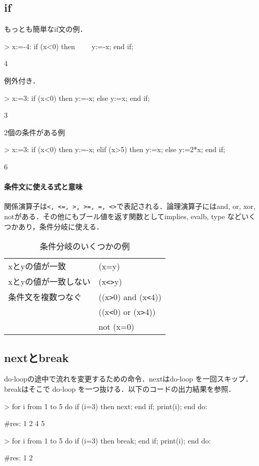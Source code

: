 \subsection{if}
もっとも簡単なif文の例．
\begin{MapleInput}
> x:=-4:
  if (x<0) then
 　　y:=-x; 
  end if;
\end{MapleInput}
\begin{MapleOutput}
 4
\end{MapleOutput}

例外付き．
\begin{MapleInput}
> x:=3:
  if (x<0) then 
    y:=-x; 
  else 
    y:=x; 
  end if;
\end{MapleInput}
\begin{MapleOutput}
3
\end{MapleOutput}
2個の条件がある例
\begin{MapleInput}
> x:=3:
  if (x<0) then 
    y:=-x; 
  elif (x>5) then 
    y:=x; 
  else
    y:=2*x; 
  end if;
\end{MapleInput}
\begin{MapleOutput}
6
\end{MapleOutput}

\paragraph{条件文に使える式と意味}
関係演算子は\verb|<, <=, >, >=, =, <>|で表記される．論理演算子にはand, or, xor, notがある．その他にもブール値を返す関数としてimplies, evalb, type などいくつかあり，条件分岐に使える．

\begin{table}[htbp]
\caption{条件分岐のいくつかの例}
\begin{center}
\begin{tabular}{|l|l|}
\hline
xとyの値が一致 & (x=y) \\
xとyの値が一致しない & (x\verb|<>|y)\\ \hline
条件文を複数つなぐ & ((x\verb|>|0) and (x\verb|<|4)) \\
&  ((x\verb|<|0) or (x\verb|>|4)) \\
&  not (x=0) \\ \hline
\end{tabular}
\end{center}
\label{default}
\end{table}%

\subsection{nextとbreak}
do-loopの途中で流れを変更するための命令．nextはdo-loop を一回スキップ．breakはそこで do-loop
を一つ抜ける．以下のコードの出力結果を参照．
\begin{MapleInput}
> for i from 1 to 5 do 
    if (i=3) then 
	  next; 
    end if; 
    print(i); 
  end do:
\end{MapleInput}
\begin{MapleError}
#res: 1 2 4 5
\end{MapleError}

\begin{MapleInput}
> for i from 1 to 5 do
    if (i=3) then
      break; 
    end if; 
    print(i); 
  end do:
\end{MapleInput}
\begin{MapleError}
#res: 1 2
\end{MapleError}


